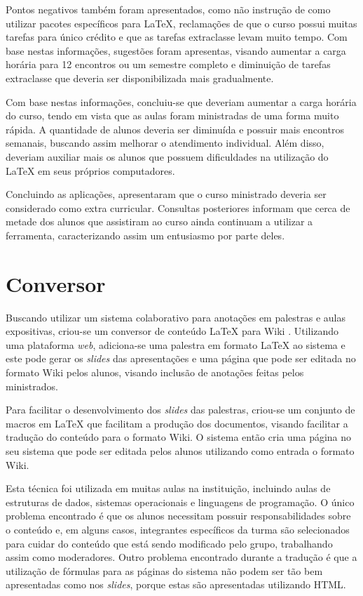 \documentclass{article}
\begin{document}
Pontos negativos também foram apresentados, como não instrução de como utilizar
pacotes específicos para \LaTeX{}, reclamações de que o curso possui muitas
tarefas para único crédito e que as tarefas extraclasse levam muito tempo. Com
base nestas informações, sugestões foram apresentas, visando aumentar a carga
horária para 12 encontros ou um semestre completo e diminuição de tarefas
extraclasse que deveria ser disponibilizada mais gradualmente.

Com base nestas informações, concluiu-se que deveriam aumentar a carga horária
do curso, tendo em vista que as aulas foram ministradas de uma forma muito
rápida. A quantidade de alunos deveria ser diminuída e possuir mais encontros
semanais, buscando assim melhorar o atendimento individual. Além disso, deveriam
auxiliar mais os alunos que possuem dificuldades na utilização do \LaTeX{} em
seus próprios computadores.

Concluindo as aplicações, apresentaram que o curso ministrado deveria ser
considerado como extra curricular. Consultas posteriores informam que cerca de
metade dos alunos que assistiram ao curso ainda continuam a utilizar a
ferramenta, caracterizando assim um entusiasmo por parte deles.

\section{Conversor}
\label{sec:conve}

Buscando utilizar um sistema colaborativo para anotações em palestras e aulas
expositivas, criou-se um conversor de conteúdo \LaTeX{} para Wiki
\cite{oneill2005}. Utilizando uma plataforma \textit{web}, adiciona-se uma
palestra em formato \LaTeX{} ao sistema e este pode gerar os \textit{slides} das
apresentações e uma página que pode ser editada no formato Wiki pelos alunos,
visando inclusão de anotações feitas pelos ministrados.

Para facilitar o desenvolvimento dos \textit{slides} das palestras, criou-se um
conjunto de macros em \LaTeX{} que facilitam a produção dos documentos, visando
facilitar a tradução do conteúdo para o formato Wiki. O sistema então cria uma
página no seu sistema que pode ser editada pelos alunos utilizando como entrada
o formato Wiki.

Esta técnica foi utilizada em muitas aulas na instituição, incluindo aulas de
estruturas de dados, sistemas operacionais e linguagens de programação. O único
problema encontrado é que os alunos necessitam possuir responsabilidades sobre o
conteúdo e, em alguns casos, integrantes específicos da turma são selecionados
para cuidar do conteúdo que está sendo modificado pelo grupo, trabalhando assim
como moderadores. Outro problema encontrado durante a tradução é que a
utilização de fórmulas para as páginas do sistema não podem ser tão bem
apresentadas como nos \textit{slides}, porque estas são apresentadas utilizando
HTML.
\end{document}
